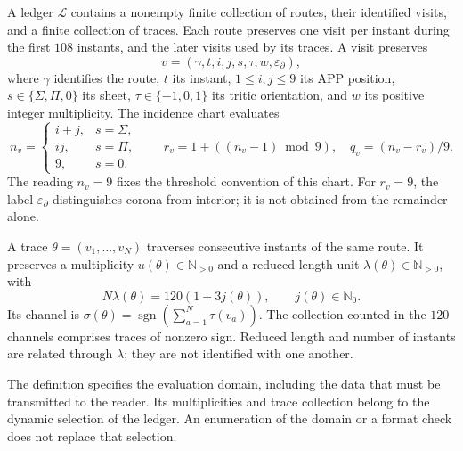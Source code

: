 \begin{definition}
\label{vi:dep:libro-dominio}
A ledger \(\mathscr L\) contains a nonempty finite collection of routes,
their identified visits, and a finite collection of traces. Each route
preserves one visit per instant during the first \(108\) instants,
and the later visits used by its traces. A visit preserves
\[
 v=(\gamma,t,i,j,s,\tau,w,\varepsilon_\partial),
\]
where \(\gamma\) identifies the route, \(t\) its instant, \(1\le i,j\le9\)
its APP position, \(s\in\{\Sigma,\Pi,0\}\) its sheet,
\(\tau\in\{-1,0,1\}\) its tritic orientation, and \(w\) its positive
integer multiplicity. The incidence chart evaluates
\[
 n_v=
 \begin{cases}
 i+j,&s=\Sigma,\\
 ij,&s=\Pi,\\
 9,&s=0.
 \end{cases}
 \qquad
 r_v=1+((n_v-1)\bmod9),\quad q_v=(n_v-r_v)/9.
\]
The reading \(n_v=9\) fixes the threshold convention of this chart.
For \(r_v=9\), the label \(\varepsilon_\partial\) distinguishes
corona from interior; it is not obtained from the remainder alone.

A trace \(\theta=(v_1,\ldots,v_N)\) traverses consecutive instants of
the same route. It preserves a multiplicity \(u(\theta)\in\mathbb N_{>0}\)
and a reduced length unit
\(\lambda(\theta)\in\mathbb N_{>0}\), with
\[
 N\lambda(\theta)=120(1+3j(\theta)),\qquad j(\theta)\in\mathbb N_0.
\]
Its channel is
\(\sigma(\theta)=\operatorname{sgn}(\sum_{a=1}^N\tau(v_a))\).
The collection counted in the \(120\) channels comprises traces of
nonzero sign. Reduced length and number of instants are
related through \(\lambda\); they are not identified with one another.
\end{definition}

The definition specifies the evaluation domain, including the
data that must be transmitted to the reader. Its multiplicities and trace
collection belong to the dynamic selection of the ledger. An enumeration
of the domain or a format check does not replace that selection.

